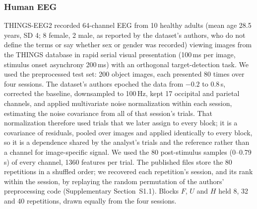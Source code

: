 \documentclass[11pt]{article}
\begin{document}
\subsubsection{Human EEG}\label{sec:data-eeg}
THINGS-EEG2 \citep{gifford2022,gifford2021data} recorded 64-channel EEG from 10 healthy adults (mean age 28.5 years, SD 4; 8 female, 2 male, as reported by the dataset's authors, who do not define the terms or say whether sex or gender was recorded) viewing images from the THINGS database \citep{hebart2019} in rapid serial visual presentation (100\,ms per image, stimulus onset asynchrony 200\,ms) with an orthogonal target-detection task.
We used the preprocessed test set: 200 object images, each presented 80 times over four sessions.
The dataset's authors epoched the data from $-0.2$ to $0.8$\,s, corrected the baseline, downsampled to 100\,Hz, kept 17 occipital and parietal channels, and applied multivariate noise normalization \citep{guggenmos2018} within each session, estimating the noise covariance from all of that session's trials.
That normalization therefore used trials that we later assign to every block; it is a covariance of residuals, pooled over images and applied identically to every block, so it is a dependence shared by the analyst's trials and the reference rather than a channel for image-specific signal.
We used the 80 post-stimulus samples (0--0.79\,s) of every channel, 1360 features per trial.
The published files store the 80 repetitions in a shuffled order; we recovered each repetition's session, and its rank within the session, by replaying the random permutation of the authors' preprocessing code (Supplementary Section~S1.1).
Blocks $F$, $U$ and $H$ held 8, 32 and 40 repetitions, drawn equally from the four sessions.
\end{document}
